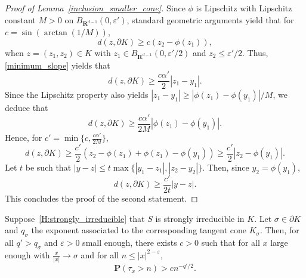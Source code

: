 \documentclass[AHL,Unicode,longabstracts,published]{cedram}
\newcommand{\pr}{\mathbf{P}}
\newcommand{\bfR}{\mathbf{R}}
\renewcommand{\epsilon}{\varepsilon}
\renewcommand{\leq}{\leqslant}
\renewcommand{\geq}{\geqslant}
\begin{document}
\begin{proof}[Proof of Lemma~\ref{inclusion_smaller_cone}]
Since $\phi$ is Lipschitz with Lipschitz constant $M>0$ on $B_{\bfR^{d-1}}(0,\epsilon')$, standard geometric arguments yield that for $c=\sin(\arctan(1/M))$,
\[
d(z,\partial K)\geq c\left(z_{2}-\phi(z_{1})\right),
\]
when $z=(z_{1},z_{2})\in K$ with $z_{1}\in B_{\bfR^{d-1}}(0,\epsilon'/2)$ and $z_{2}\leq \epsilon'/2$. Thus, \eqref{minimum_slope} yields that
\begin{equation}\label{first_coordinate}
d(z,\partial K)\geq \frac{c\alpha'}{2} |z_{1}-y_{1}|.
\end{equation}
Since the Lipschitz property also yields $| z_{1}-y_{1}|\geq |\phi(z_{1})-\phi(y_{1})|/M$, we deduce that
\[
d(z,\partial K)\geq \frac{c\alpha'}{2M}| \phi(z_{1})-\phi(y_{1})|.
\]
Hence, for $c'=\min\{c,\tfrac{c\alpha'}{2M}\}$,
\begin{equation}\label{second_coordinate}
d(z,\partial K)\geq \frac{c'}{2}\left(z_{2}-\phi(z_{1})+\phi(z_{1})-\phi(y_{1})\right)\geq \frac{c'}{2}|z_{2}-\phi(y_{1})|.
\end{equation}
Let $t$ be such that $|y-z| \leq t\max\{| y_{1}-z_{1}|,| z_{2}-y_{2}|\}$. Then, since $y_{2}=\phi(y_{1})$,
\[
d(z,\partial K)\geq \frac{c'}{2t}| y-z|.
\]
This concludes the proof of the second statement.
\end{proof}

\begin{prop}\label{lower_bound_survival_tangent}
Suppose~\eqref{H:strongly_irreducible} that $S$ is strongly irreducible in $K$. Let $\sigma\in\partial K$ and $q_{\sigma}$ the exponent associated to the corresponding tangent cone $K_{\sigma}$. Then, for all $q'>q_{\sigma}$ and $\epsilon>0$ small enough, there exists $c>0$ such that for all $x$ large enough with $\frac{x}{| x|} \rightarrow \sigma$ and for all $n\leq |x|^{2-\epsilon}$,
\[
\pr(\tau_{x}>n)>cn^{-q'/2}.
\]
\end{prop}
\end{document}
